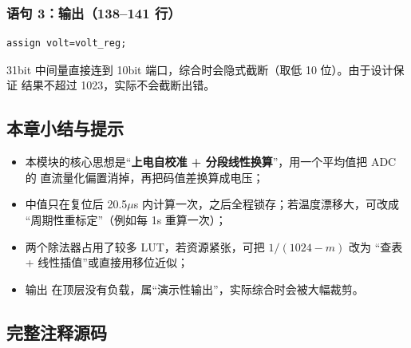 \subsubsection{语句 3：输出（138--141 行）}

\begin{lstlisting}[style=vsnip]
assign volt=volt_reg;
\end{lstlisting}

31bit 中间量直接连到 10bit 端口，综合时会隐式截断（取低 10 位）。由于设计保证
结果不超过 1023，实际不会截断出错。

\subsection{本章小结与提示}

\begin{itemize}[leftmargin=2em,itemsep=2pt]
\item 本模块的核心思想是“\textbf{上电自校准 + 分段线性换算}”，用一个平均值把 ADC 的
      直流量化偏置消掉，再把码值差换算成电压；
\item 中值只在复位后 20.5$\mu$s 内计算一次，之后全程锁存；若温度漂移大，可改成
      “周期性重标定”（例如每 1s 重算一次）；
\item 两个除法器占用了较多 LUT，若资源紧张，可把 $1/(1024-m)$ 改为
      “查表 + 线性插值”或直接用移位近似；
\item 输出  在顶层没有负载，属“演示性输出”，实际综合时会被大幅裁剪。
\end{itemize}

\subsection{完整注释源码}


